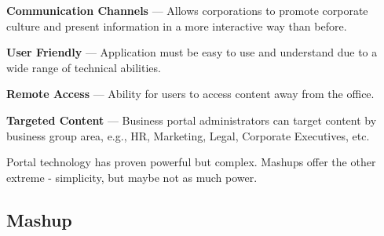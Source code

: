 		\textbf{Communication Channels} — Allows corporations to promote corporate culture and present information in a more interactive way than before.

		\textbf{User Friendly} — Application must be easy to use and understand due to a wide range of technical abilities.

		\textbf{Remote Access} — Ability for users to access content away from the office.

		\textbf{Targeted Content} — Business portal administrators can target content by business group area, e.g., HR, Marketing, Legal, Corporate Executives, etc.

		Portal technology has proven powerful but complex. Mashups offer the other extreme - simplicity, but maybe not as much power. 

	\subsection{Mashup}

